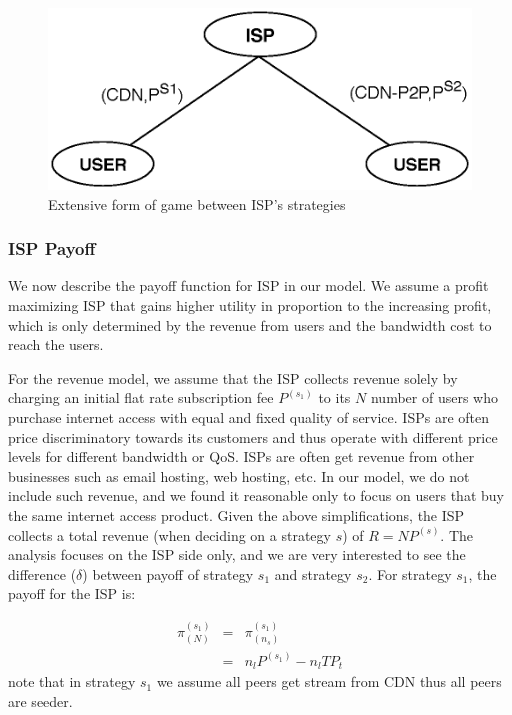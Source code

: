 \documentclass[paper]{ieice}
\begin{document}
\begin{figure}[tb] 
\begin{center}
\includegraphics[scale=0.5]{graphs/game-tree-2.eps}
\end{center}
\caption{Extensive form of game between ISP's strategies}
\label{fig:gametree}
\vspace{-2mm}
\end{figure}

\subsubsection{ISP Payoff}

We now describe the payoff function for ISP in our model.  
We assume a profit maximizing ISP that gains higher utility in proportion to the increasing profit, which is only determined by the revenue from users and the bandwidth cost to reach the users.

For the revenue model, we assume that the ISP collects revenue solely by charging an initial flat rate subscription fee $P^{(s_1)}$ to its $N$ number of users who purchase internet access with equal and fixed quality of service.
ISPs are often price discriminatory towards its customers and thus operate with different price levels for different bandwidth or QoS.
ISPs are often get revenue from other businesses such as email hosting, web hosting, etc. 
In our model, we do not include such revenue, and we found it reasonable only to focus on users that buy the same internet access product. 
Given the above simplifications, the ISP collects a total revenue (when deciding on a strategy $s$) of $R = N P^{(s)}$.
The analysis focuses on the ISP side only, and we are very interested to see the difference ($\delta$) between payoff of strategy $s_1$ and strategy $s_2$.
For strategy $s_1$, the payoff for the ISP is: 

\begin{eqnarray}
	\pi^{(s_1)}_{(N)}&=&\pi^{(s_1)}_{(n_s)}\\
	&=&n_l P^{(s_1)} - n_l T P_t
\end{eqnarray}
note that in strategy $s_1$ we assume all peers get stream from CDN thus all peers are seeder. 
\end{document}

